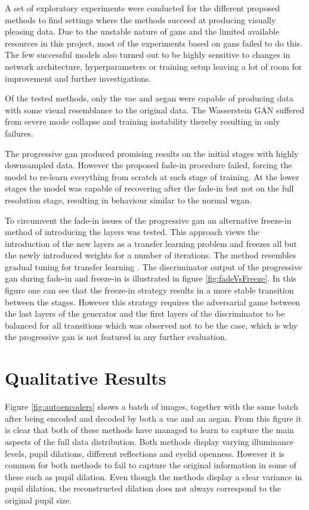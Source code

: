 A set of exploratory experiments were conducted for the different proposed methods to find settings where the methods succeed at producing visually pleasing data. Due to the unstable nature of \acrshort{gans} and the limited available resources in this project, most of the experiments based on \acrshort{gans} failed to do this. The few successful models also turned out to be highly sensitive to changes in network architecture, hyperparameters or training setup leaving a lot of room for improvement and further investigations. 

Of the tested methods, only the \acrshort{vae} and \acrshort{aegan} were capable of producing data with some visual resemblance to the original data. The Wasserstein GAN suffered from severe mode collapse and training instability thereby resulting in only failures.

The progressive \acrshort{gan} produced promising results on the initial stages with highly downsampled data. However the proposed fade-in procedure failed, forcing the model to re-learn everything from scratch at each stage of training. At the lower stages the model was capable of recovering after the fade-in but not on the full resolution stage, resulting in behaviour similar to the normal \acrshort{wgan}. 

To circumvent the fade-in issues of the progressive \acrshort{gan} an alternative freeze-in method of introducing the layers was tested. This approach views the introduction of the new layers as a transfer learning problem and freezes all but the newly introduced weights for a number of iterations. The method resembles gradual tuning for transfer learning \parencite{montone2017gradual}. The discriminator output of the progressive \acrshort{gan} during fade-in and freeze-in is illustrated in figure \ref{fig:fadeVsFreeze}. In this figure one can see that the freeze-in strategy results in a more stable transition between the stages. However this strategy requires the adversarial game between the last layers of the generator and the first layers of the discriminator to be balanced for all transitions which was observed not to be the case, which is why the progressive \acrshort{gan} is not featured in any further evaluation.

\section{Qualitative Results}
Figure \ref{fig:autoencoders} shows a batch of images, together with the same batch after being encoded and decoded by both a \acrshort{vae} and an \acrshort{aegan}. From this figure it is clear that both of these methods have managed to learn to capture the main aspects of the full data distribution. Both methods display varying illuminance levels, pupil dilations, different reflections and eyelid openness. However it is common for both methods to fail to capture the original information in some of these such as pupil dilation. Even though the methods display a clear variance in pupil dilation, the reconstructed dilation does not always correspond to the original pupil size.

